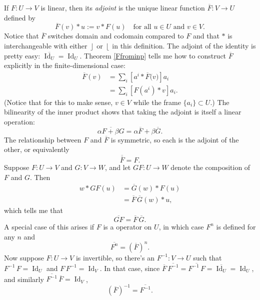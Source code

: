 \documentclass{utarticle}
\newcommand{\Id}{\operatorname{Id}}
\DeclareMathOperator{\lin}{\rfloor}
\DeclareMathOperator{\rin}{\lfloor}
\newcommand{\scprod}[2]{\ensuremath{#1 * #2}}
\newcommand{\adj}[1]{\ensuremath{\overline{#1}}}
\newcommand{\doubleadj}[1]{\ensuremath{\overline{\overline{#1}}}}
\begin{document}
If $F: U \rightarrow V$ is linear, then its \emph{adjoint} is the unique linear function $\adj{F}: V 
\rightarrow U$ defined by
\begin{equation} 
\scprod{\adj{F}(v)}{u} := \scprod{v}{F(u)} \quad \text{for all $u \in U$ and $v \in V$.} 
\label{definevecadj} 
\end{equation} 
Notice that \adj{F} switches domain and codomain compared to $F$ and that \scprod{}{} is 
interchangeable with either $\lin$ or $\rin$ in this definition.  The adjoint of the identity is pretty 
easy: $\adj{\Id_U} = \Id_U$.  Theorem \ref{Ffrominp} tells me how to construct \adj{F} explicitly 
in the finite-dimensional case:
\begin{align}
\adj{F}(v) & = \sum_i \left[\scprod{a^i}{\adj{F}(v})\right] a_i \nonumber \\
                  & = \sum_i \left[\scprod{F(a^i)}{v}\right] a_i.
\end{align}
(Notice that for this to make sense, $v \in V$ while the frame $\{a_i\} \subset U$.)  The bilinearity
of the inner product shows that taking the adjoint is itself a linear operation:
\begin{equation} \adj{\alpha F + \beta G} = \alpha \adj{F} + \beta \adj{G}.  \end{equation}
The relationship between $F$ and \adj{F} is symmetric, so each is the adjoint of the other, or 
equivalently
\begin{equation} \doubleadj{F} = F. \end{equation}
Suppose $F: U \rightarrow V$ and $G: V \rightarrow W$, and let $GF: U \rightarrow W$ denote the 
composition of $F$ and $G$.  Then
\begin{align}
\scprod{w}{GF(u)} & = \scprod{\adj{G}(w)}{F(u)} \nonumber \\
                     & = \scprod{\adj{F}\,\adj{G}(w)}{u},
\end{align}
which tells me that
\begin{equation} \adj{GF} = \adj{F}\,\adj{G}. \end{equation}  
A special case of this arises if $F$ is a operator on $U$, in which case $F^n$ is defined for any 
$n$ and 
\begin{equation} \adj{F^n} = (\adj{F})^n. \end{equation}
Now suppose $F: U \rightarrow V$ is invertible, so there's an $F^{-1}: V \rightarrow U$ such that 
$F^{-1}\,F=\Id_U$ and $F\,F^{-1} = \Id_V$.  In that case, since $\adj{F}\,\adj{F^{-1}} = \adj{F^{-1}\,F} = 
\adj{\Id_U} = \Id_U$, and similarly $\adj{F^{-1}}\,\adj{F}=\Id_V$,
\begin{equation} (\adj{F})^{-1} = \adj{F^{-1}}. \end{equation}
\end{document}

